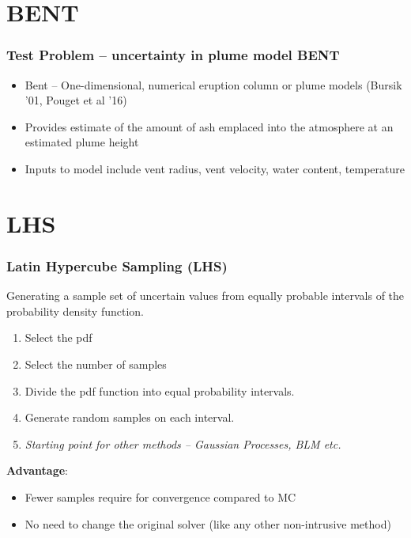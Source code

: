 \documentclass[10pt]{beamer}
\begin{document}
\section{BENT}
\begin{frame}
\frametitle{Test Problem -- uncertainty  in plume model BENT}
\begin{itemize}
\item Bent -- One-dimensional, numerical eruption column or plume models (Bursik '01, Pouget et al '16)
\item Provides  estimate  of the amount of ash emplaced into the atmosphere at an estimated plume height
\item Inputs to model include vent radius, vent velocity, water content, temperature
\end{itemize}
\end{frame}
\section{LHS}
\begin{frame}
\frametitle{Latin Hypercube Sampling (LHS)}
Generating a sample set of uncertain values from equally probable intervals of the probability density function.\\

\begin{enumerate}
    \item Select the pdf
    \item Select the number of samples
    \item Divide the pdf function into equal probability intervals.
    \item Generate random samples on each interval.
    \item {\it Starting point for other methods -- Gaussian Processes, BLM etc.}
\end{enumerate}
{\bf Advantage}:
\begin{itemize}
    \item Fewer samples require for convergence compared to MC
    \item No need to change the original solver (like any other non-intrusive method)
\end{itemize}
\end{frame}
\end{document}
